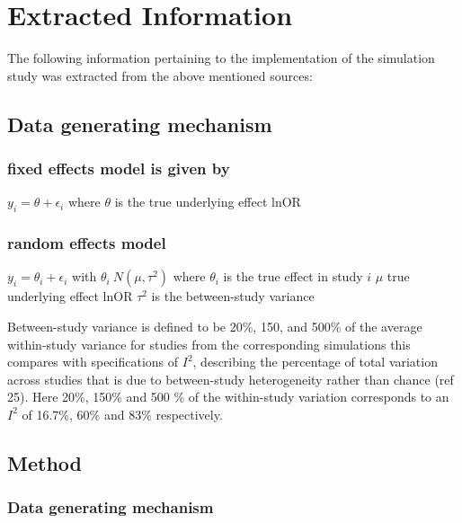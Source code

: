 \documentclass[english,doc,floatsintext]{apa6}
\begin{document}
\hypertarget{extracted-information}{%
\section{Extracted Information}\label{extracted-information}}

The following information pertaining to the implementation of the simulation study was extracted from the above mentioned sources:

\hypertarget{data-generating-mechanism}{%
\subsection{Data generating mechanism}\label{data-generating-mechanism}}

\hypertarget{fixed-effects-model-is-given-by}{%
\subsubsection{fixed effects model is given by}\label{fixed-effects-model-is-given-by}}

\(y_i=\theta + \epsilon_i\)
where \(\theta\) is the true underlying effect lnOR

\hypertarget{random-effects-model}{%
\subsubsection{random effects model}\label{random-effects-model}}

\(y_i = \theta_i + \epsilon_i\)
with \(\theta_i~ N(\mu,\tau^2)\)
where \(\theta_i\) is the true effect in study \(i\)
\(\mu\) true underlying effect lnOR
\(\tau^2\) is the between-study variance

Between-study variance is defined to be 20\%, 150, and 500\% of the average within-study variance for studies from the corresponding simulations
this compares with specifications of \(I^2\), describing the percentage of total variation across studies that is due to between-study heterogeneity rather than chance (ref 25). Here 20\%, 150\% and 500 \% of the within-study variation corresponds to an \(I^2\) of 16.7\%, 60\% and 83\% respectively.

\hypertarget{method}{%
\subsection{Method}\label{method}}

\hypertarget{data-generating-mechanism-1}{%
\subsubsection{Data generating mechanism}\label{data-generating-mechanism-1}}
\end{document}
